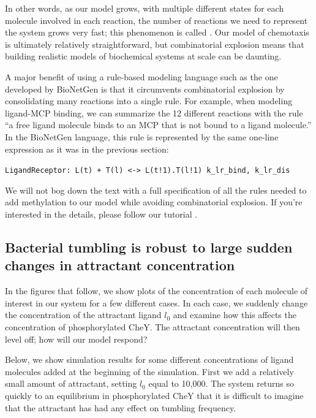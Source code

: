 In other words, as our model grows, with multiple different states for each molecule involved in each reaction, the number of reactions we need to represent the system grows very fast; this phenomenon is called . Our model of chemotaxis is ultimately relatively straightforward, but combinatorial explosion means that building realistic models of biochemical systems at scale can be daunting.

A major benefit of using a rule-based modeling language such as the one developed by BioNetGen is that it circumvents combinatorial explosion by consolidating many reactions into a single rule. For example, when modeling ligand-MCP binding, we can summarize the 12 different reactions with the rule ``a free ligand molecule binds to an MCP that is not bound to a ligand molecule.'' In the BioNetGen language, this rule is represented by the same one-line expression as it was in the previous section:

\texttt{LigandReceptor: L(t) + T(l) <-> L(t!1).T(l!1) k\_lr\_bind, k\_lr\_dis}

We will not bog down the text with a full specification of all the rules needed to add methylation to our model while avoiding combinatorial explosion. If you're interested in the details, please follow our tutorial .


\FloatBarrier
{}
\subsection{Bacterial tumbling is robust to large sudden changes in attractant concentration}

In the figures that follow, we show plots of the concentration of each molecule of interest in our system for a few different cases. In each case, we suddenly change the concentration of the attractant ligand $l_0$ and examine how this affects the concentration of phosphorylated CheY. The attractant concentration will then level off; how will our model respond?

Below, we show simulation results for some different concentrations of ligand molecules added at the beginning of the simulation. First we add a relatively small amount of attractant, setting $l_0$ equal to 10,000. The system returns so quickly to an equilibrium in phosphorylated CheY that it is difficult to imagine that the attractant has had any effect on tumbling frequency.

